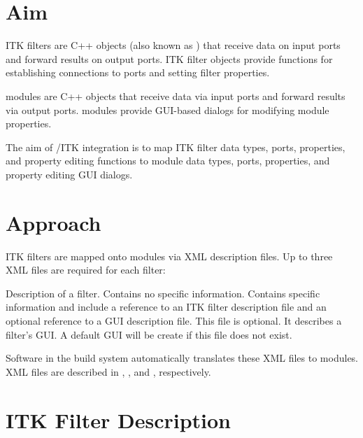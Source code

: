 \section{Aim}
\label{sec:itk_mods:aim}

ITK filters are C++ objects (also known as ) that
receive data on input ports and forward results on output ports.
ITK filter objects provide functions for establishing connections to
ports and setting filter properties.

\sr{} modules are C++ objects that receive data via input ports
and forward results via output ports.  \sr{} modules provide
GUI-based dialogs for modifying  module properties.

The aim of \sr{}/ITK integration is to map ITK filter data types,
ports, properties, and property editing functions to \sr{} module data
types, ports, properties, and property editing GUI dialogs.


\section{Approach}
\label{sec:itk_mods:approach}

ITK filters are mapped onto \sr{} modules via XML description files.
Up to three XML files are required for each filter:

\begin{description}
 Description of a filter.  Contains
no \sr{} specific information.  
 Contains \sr{} specific
information and include a reference to an ITK filter description file
and an optional reference to a GUI description file.
 This file is optional.  It describes a
filter's GUI.  A default GUI will be create if this file does not exist.
\end{description}

Software in the \sr{} build system automatically translates these XML
files to \sr{} modules.   XML files are described in
,
, and
,
respectively.


\section{ITK Filter Description}
\label{sec:itk_mods:itk_filter_desc}

